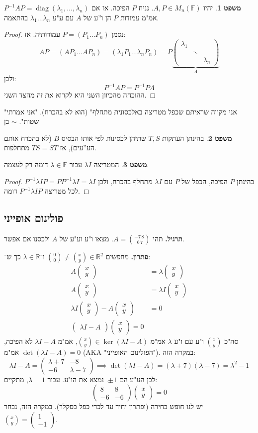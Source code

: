 \documentclass[a4paper]{article}
\newcommand\R     {\mathbb{R}}
\DeclareMathOperator{\diag}    {diag}
\newcommand\F         {\mathbb{F}}
\newcommand\pms[1]    {\begin{pmatrix}
		#1
\end{pmatrix}}
\renewcommand\lg      {\lambda}
\newcommand\Lg        {\Lambda}
\newcommand\op    {^{-1}}
\theoremstyle{definition}
\newtheorem{Theorem}{\color{myblue}משפט}
\newcommand\theo  [1] {\begin{Theorem}#1\end{Theorem}}
\begin{document}
	\theo{יהיו $A, P \in M_n(\F)$. נניח $P$ הפיכה. אז אם $P\op AP = \diag(\lg_1, \dots, \lg_n)$ אמ"מ עמודות $P$ הן ו''ע של $A$ עם ע"ע $\lg_1 \dots \lg_n$ בהתאמה. }
	
	\begin{proof}
		נסמן $P = (P_1 \dots P_n)$ עמודותיה. אז: 
		\[ AP = (AP_1 \dots AP_n) = (\lg_1P_1 \dots \lg_nP_n) = P\underbrace{\pms{\lg_1 && \\ & \ddots & \\ && \lg_n}}_{\Lg} \]
		ולכן: 
		\[ P\op AP = P\op P\Lg \]
		ההוכחה מהכיוון השני היא לקרוא את זה מהצד השני. 
	\end{proof}
	
	"אני מקווה שראיתם שכפל מטריצה באלכסונית מתחלף" (הוא לא בהכרח). 
	"אני אמרתי שטות". $\sim$ בן 
	
	\theo{בהינתן העתקות $T, S$ שתיהן לכסינות לפי אותו הבסיס $B$ (לא בהכרח אותם הע''עים), אז $TS = ST$ מתחלפות. }
	\theo{המטריצה $\lg I$ עבור $\lg \in \F$ דומה רק לעצמה. }\begin{proof}
		בהינתן $P$ הפיכה, הכפל של $P$ עם $\lg I$ מתחלף בהכרח, ולכן $P\op \lg I P = P P\op \lg I = \lg I$ לכל מטריצה $P\op \lg I P$ דומה. 
	\end{proof}
	
	\subsection{פולינום אופייני}
	\textbf{תרגיל. }תהי $A = \binom{-7 \, 8}{\,\,6 \, 7}$. מצאו ו"ע וע"ע של $A$ ולכסנו אם אפשר. 
	
	\textbf{פתרון. }מחפשים $\binom{0}{0} \neq \binom{x}{y} \in \R^2$ ו־$\lg \in \R$ כך ש־: 
	\begin{align*}
		A\pms{x \\ y} &= \lg \pms{x \\ y} \\
		A\pms{x \\ y} &= \lg I \pms{x \\ y} \\
		\lg I \pms{x \\ y} - A \pms{x \\ y} &= 0 \\
		\pms{\lg I - A} \pms{x \\ y} = 0
	\end{align*}
	סה"כ $\binom{x}{y}$ ו"ע עם ו"ע $\lg$ אמ"מ $\binom{x}{y} \in \ker (\lg I - A)$, אמ"מ $\lg I - A$ לא הפיכה, אמ"מ $\det(\lg I - A) = 0$ (AKA "הפולינום האופייני"). במקרה הזה: 
	\[ \lg I - A = \pms{\lg + 7 & -8 \\ -6 & \lg - 7} \implies \det(\lg I - A) = (\lg + 7)(\lg - 7) = \lg^2 - 1 \]
	לכן הע"ע הם $\pm 1$. נמצא את הו"ע. עבור $\lg = 1$, מתקיים: 
	\[ \pms{8 & 8 \\ -6 & -6}\pms{x \\ y} = 0 \]
	יש לנו חופש בחירה (ופתרון יחיד עד לכדי כפל בסקלר). במקרה הזה, נבחר $\binom{x}{y} = \pms{1 \\ -1}$. 
	
\end{document}
